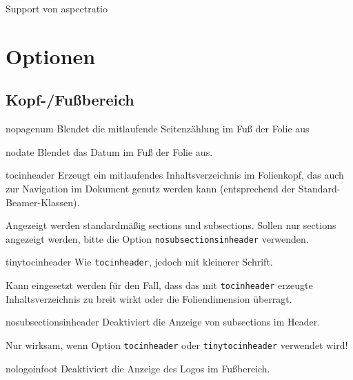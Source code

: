 \documentclass[a4paper,colorscheme=green,TUBStitlepage=picture]{tubsreprt}
\begin{document}
Support von aspectratio


\section{Optionen}


\subsection{Kopf-/Fußbereich}

\begin{classoption}{nopagenum}
  Blendet die mitlaufende Seitenzählung im Fuß der Folie aus
\end{classoption}

\begin{classoption}{nodate}
  Blendet das Datum im Fuß der Folie aus.
\end{classoption}

\begin{classoption}{tocinheader}
  Erzeugt ein mitlaufendes Inhaltsverzeichnis im Folienkopf,
  das auch zur Navigation im Dokument genutz werden kann
  (entsprechend der Standard-Beamer-Klassen).
  
  Angezeigt werden standardmäßig sections und subsections.
  Sollen nur sections angezeigt werden, bitte die Option
  \lstinline{nosubsectionsinheader} verwenden.
  
\end{classoption}

\begin{classoption}{tinytocinheader}
  Wie \lstinline{tocinheader}, jedoch mit kleinerer Schrift.

  Kann eingesetzt werden für den Fall, dass das mit \lstinline{tocinheader}
  erzeugte Inhaltsverzeichnis zu breit wirkt oder die Foliendimension
  überragt.
\end{classoption}

\begin{classoption}{nosubsectionsinheader}
  Deaktiviert die Anzeige von subsections im Header.
  
  Nur wirksam, wenn Option \lstinline{tocinheader} oder
  \lstinline{tinytocinheader} verwendet wird!
\end{classoption}

\begin{classoption}{nologoinfoot}
  Deaktiviert die Anzeige des Logos im Fußbereich.
\end{classoption}
\end{document}

